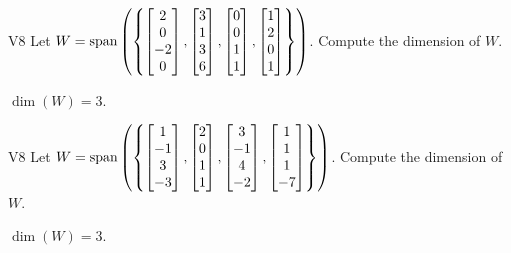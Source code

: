 \begin{problem}{V8}
Let \(W=\operatorname{span}\left(\left\{\begin{bmatrix} 2 \\ 0 \\ -2 \\ 0 \end{bmatrix}, \begin{bmatrix} 3 \\ 1 \\ 3 \\ 6 \end{bmatrix}, \begin{bmatrix} 0 \\ 0 \\ 1 \\ 1 \end{bmatrix}, \begin{bmatrix}1 \\ 2 \\ 0 \\ 1 \end{bmatrix}\right\}\right)\). Compute the dimension of \(W\).
\end{problem}
\begin{solution}
 \(\dim(W) =3\).
\end{solution}


\begin{problem}{V8}
Let \(W=\operatorname{span}\left( \left\{ \begin{bmatrix} 1 \\ -1 \\ 3 \\ -3 \end{bmatrix},\begin{bmatrix} 2 \\ 0 \\ 1 \\ 1 \end{bmatrix}, \begin{bmatrix} 3 \\ -1 \\ 4 \\ -2 \end{bmatrix},  \begin{bmatrix} 1 \\ 1 \\ 1 \\ -7 \end{bmatrix} \right\}\right)\).  Compute the dimension of \(W\).
\end{problem}
\begin{solution}
\(\dim(W)=3\).
\end{solution}







